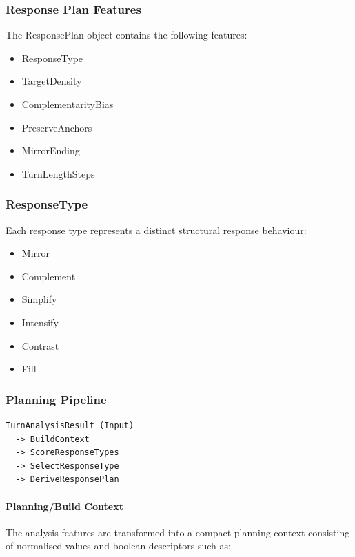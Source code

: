 \subsubsection{Response Plan Features}\label{response-plan-features}

The ResponsePlan object contains the following features:

\begin{itemize}
\item
  ResponseType
\item
  TargetDensity
\item
  ComplementarityBias
\item
  PreserveAnchors
\item
  MirrorEnding
\item
  TurnLengthSteps
\end{itemize}

\subsubsection{ResponseType}\label{responsetype}

Each response type represents a distinct structural response behaviour:

\begin{itemize}
\item
  Mirror
\item
  Complement
\item
  Simplify
\item
  Intensify
\item
  Contrast
\item
  Fill
\end{itemize}

\subsubsection{Planning Pipeline}\label{planning-pipeline}

\begin{lstlisting}
TurnAnalysisResult (Input)
  -> BuildContext
  -> ScoreResponseTypes
  -> SelectResponseType
  -> DeriveResponsePlan
\end{lstlisting}

\paragraph{Planning/Build Context}\label{planningbuild-context}

The analysis features are transformed into a compact planning context
consisting of normalised values and boolean descriptors such as:

